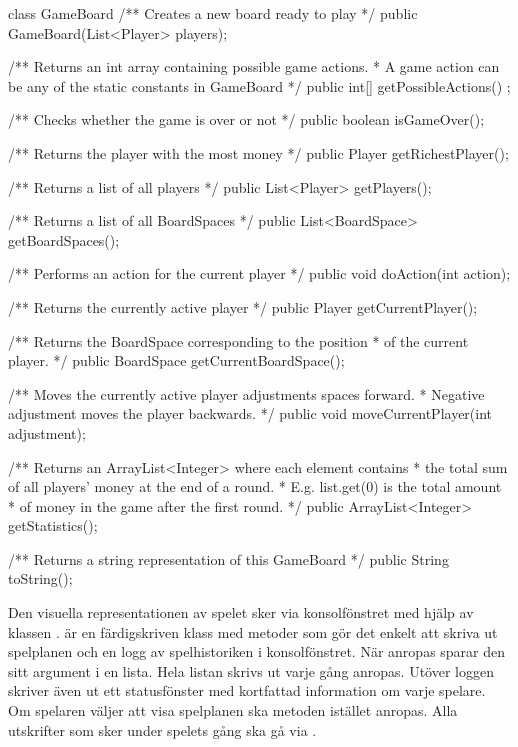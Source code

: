 \begin{JavaSpec}{class GameBoard}
    /** Creates a new board ready to play */
    public GameBoard(List<Player> players);

    /** Returns an int array containing possible game actions.
     *  A game action can be any of the static constants in GameBoard */
    public int[] getPossibleActions() ;

    /** Checks whether the game is over or not */
    public boolean isGameOver();

    /** Returns the player with the most money */
    public Player getRichestPlayer();

    /** Returns a list of all players */
    public List<Player> getPlayers();

    /** Returns a list of all BoardSpaces */
    public List<BoardSpace> getBoardSpaces();

    /** Performs an action for the current player */
    public void doAction(int action);

    /** Returns the currently active player */
    public Player getCurrentPlayer();

    /** Returns the BoardSpace corresponding to the position
     *  of the current player. */
    public BoardSpace getCurrentBoardSpace();

    /** Moves the currently active player adjustments spaces forward.
     *  Negative adjustment moves the player backwards. */
    public void moveCurrentPlayer(int adjustment);

    /** Returns an ArrayList<Integer> where each element contains
     *  the total sum of all players' money at the end of a round.
     *  E.g. list.get(0) is the total amount
     *  of money in the game after the first round. */
    public ArrayList<Integer> getStatistics();

    /** Returns a string representation of this GameBoard */
    public String toString();
\end{JavaSpec}


Den visuella representationen av spelet sker via konsolfönstret med hjälp av klassen .  är en färdigskriven klass med metoder som gör det enkelt att skriva ut spelplanen och en logg av spelhistoriken i konsolfönstret.
 När  anropas sparar den sitt argument i en lista. Hela listan skrivs ut varje gång  anropas.
Utöver loggen skriver  även ut ett statusfönster med kortfattad information om varje spelare.
Om spelaren väljer att visa spelplanen ska metoden  istället anropas.
Alla utskrifter som sker under spelets gång ska gå via .
\newline

